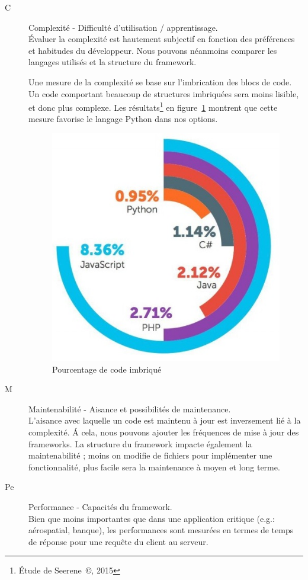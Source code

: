 \documentclass{EPL-master-thesis-covers-FR}
\begin{document}
					\begin{description}
						\item[C] Complexité - Difficulté d'utilisation / apprentissage. \hfill \\
							\'Evaluer la complexité est hautement subjectif en fonction des préférences et habitudes du développeur. Nous pouvons néanmoins comparer les langages utilisés et la structure du framework.

							Une mesure de la complexité se base sur l'imbrication des blocs de code. Un code comportant beaucoup de structures imbriquées sera moins lisible, et donc plus complexe. Les résultats\footnote{\'Etude de Seerene~\copyright, 2015} en figure~\ref{fig:complexity} montrent que cette mesure favorise le langage Python dans nos options.

							\begin{figure}
								\centering
								\includegraphics[width=.6\textwidth]{images/complexity}
								\caption{Pourcentage de code imbriqué}
								\label{fig:complexity}
							\end{figure}

					\item[M] Maintenabilité - Aisance et possibilités de maintenance. \hfill \\
							L'aisance avec laquelle un code est maintenu à jour est inversement lié à la complexité. \'A cela, nous pouvons ajouter les fréquences de mise à jour des frameworks. La structure du framework impacte également la maintenabilité ; moins on modifie de fichiers pour implémenter une fonctionnalité, plus facile sera la maintenance à moyen et long terme.

					\item[Pe] Performance - Capacités du framework. \hfill \\
							Bien que moins importantes que dans une application critique (e.g.: aérospatial, banque), les performances sont mesurées en termes de temps de réponse pour une requête du client au serveur.


\end{description}
\end{document}
